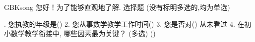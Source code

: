 \documentclass[a4paper,12pt,twoside]{ctexart}
\begin{document}
\begin{CJK*}{GBK}{song}
     您好！为了能够直观地了解. 选择题 (没有标明多选的,均为单选)

   . 您执教的年级是\hfill(\qquad)
   2. 您从事数学教学工作时间\hfill(\qquad)
   3. 您是否对\hfill(\qquad)
       {从未看过}
   4. 在初小数学教学衔接中, 哪些因素最为关键？ (多选) \hfill(\qquad)
   \vspace*{-20pt}
\end{CJK*}
\end{document}

